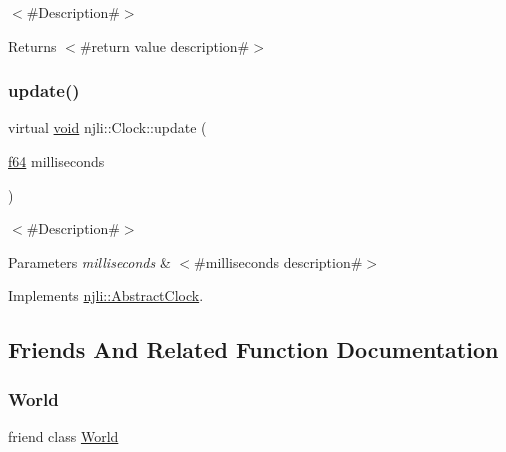 $<$\#\+Description\#$>$

\begin{DoxyReturn}{Returns}
$<$\#return value description\#$>$ 
\end{DoxyReturn}
\mbox{\label{classnjli_1_1_clock_aacf123c98c4ff46f5716b488423de72b}} 
\subsubsection{\texorpdfstring{update()}{update()}}
{\footnotesize\ttfamily virtual \mbox{\hyperlink{_thread_8h_af1e856da2e658414cb2456cb6f7ebc66}{void}} njli\+::\+Clock\+::update (\begin{DoxyParamCaption}\item[{\mbox{\hyperlink{_util_8h_a94dab5770726ccbef8c7d026cfbdf8e5}{f64}}}]{milliseconds }\end{DoxyParamCaption})\hspace{0.3cm}{\ttfamily [virtual]}}

$<$\#\+Description\#$>$


\begin{DoxyParams}{Parameters}
{\em milliseconds} & $<$\#milliseconds description\#$>$ \\
\hline
\end{DoxyParams}


Implements \mbox{\hyperlink{classnjli_1_1_abstract_clock_a06401048780f7b9522187731d3a97579}{njli\+::\+Abstract\+Clock}}.



\subsection{Friends And Related Function Documentation}
\mbox{\label{classnjli_1_1_clock_a7b4bcdf992c21ae83363f25df05b1d25}} 
\subsubsection{\texorpdfstring{World}{World}}
{\footnotesize\ttfamily friend class \mbox{\hyperlink{classnjli_1_1_world}{World}}\hspace{0.3cm}{\ttfamily [friend]}}



